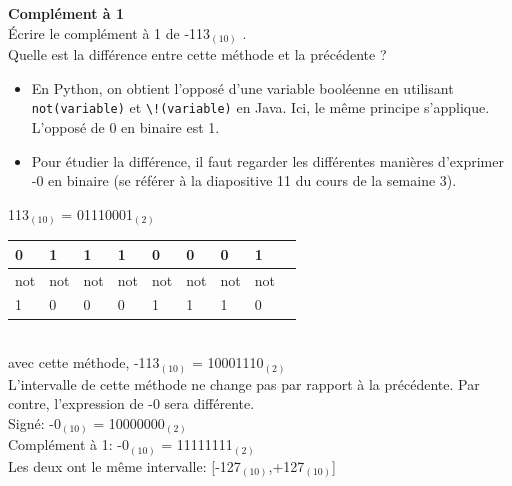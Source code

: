 \begin{Exercice}[5 minutes] \textbf{Complément à 1}\\
    Écrire le complément à 1 de -113$_{(10)}$ . \\

	Quelle est la différence entre cette méthode et la précédente ?

    \begin{conseil}
        \begin{itemize}
        	\item En Python, on obtient l'opposé d'une variable booléenne en utilisant \lstinline{not(variable)} et \lstinline{\!(variable)} en Java. Ici, le même principe s'applique. L'opposé de 0 en binaire est 1.
        	\item Pour étudier la différence, il faut regarder les différentes manières d'exprimer -0 en binaire (se référer à la diapositive 11 du cours de la semaine 3).
        \end{itemize} 
    \end{conseil}
    
    \begin{solution}
    	113$_{(10)}$ = 01110001$_{(2)}$ \\
    	
        \begin{tabular}{| p{1cm} | p{1cm} | p{1cm} | p{1cm} | p{1cm} | p{1cm} | p{1cm} | p{1cm} | p{1cm} |} 
            \hline
            0 & 1 & 1 & 1 & 0 & 0 & 0 & 1 \\ [0.5ex] 
            \hline
            not & not & not & not & not & not & not & not \\ [0.5ex]
            \hline
            1 & 0 & 0 & 0 & 1 & 1 & 1 & 0 \\ [0.5ex]
            \hline
        \end{tabular} \\
        
        avec cette méthode, -113$_{(10)}$ = 10001110$_{(2)}$ \\
        
        L'intervalle de cette méthode ne change pas par rapport à la précédente. Par contre, l'expression de -0 sera différente.\\
        
        Signé: -0$_{(10)}$ = 10000000$_{(2)}$ \\
        
        Complément à 1: -0$_{(10)}$ = 11111111$_{(2)}$ \\
        
        Les deux ont le même intervalle: [-127$_{(10)}$,+127$_{(10)}$] \\
        
    \end{solution}
\end{Exercice}

